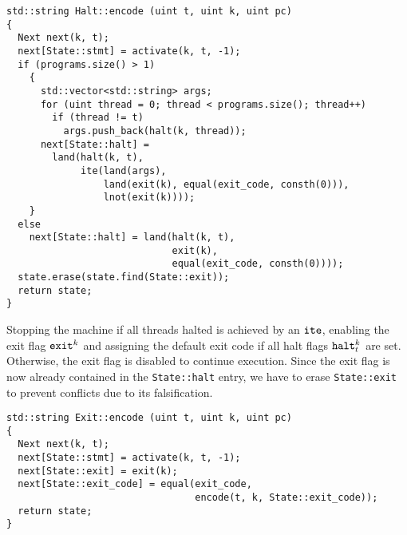\begin{lstlisting}[style=c++, style=encode]
std::string Halt::encode (uint t, uint k, uint pc)
{
  Next next(k, t);
  next[State::stmt] = activate(k, t, -1);
  if (programs.size() > 1)
    {
      std::vector<std::string> args;
      for (uint thread = 0; thread < programs.size(); thread++)
        if (thread != t)
          args.push_back(halt(k, thread));
      next[State::halt] =
        land(halt(k, t),
             ite(land(args),
                 land(exit(k), equal(exit_code, consth(0))),
                 lnot(exit(k))));
    }
  else
    next[State::halt] = land(halt(k, t),
                             exit(k),
                             equal(exit_code, consth(0))));
  state.erase(state.find(State::exit));
  return state;
}
\end{lstlisting}

\noindent
Stopping the machine if all threads halted is achieved by an $\texttt{ite}$, enabling the exit flag $\texttt{exit}^k$ and assigning the default exit code if all halt flags $\texttt{halt}^k_t$ are set.
Otherwise, the exit flag is disabled to continue execution.
Since the exit flag is now already contained in the \texttt{State::halt} entry, we have to erase \texttt{State::exit} to prevent conflicts due to its falsification. %


\begin{lstlisting}[style=c++, style=encode]
std::string Exit::encode (uint t, uint k, uint pc)
{
  Next next(k, t);
  next[State::stmt] = activate(k, t, -1);
  next[State::exit] = exit(k);
  next[State::exit_code] = equal(exit_code,
                                 encode(t, k, State::exit_code));
  return state;
}
\end{lstlisting}

\newpage


